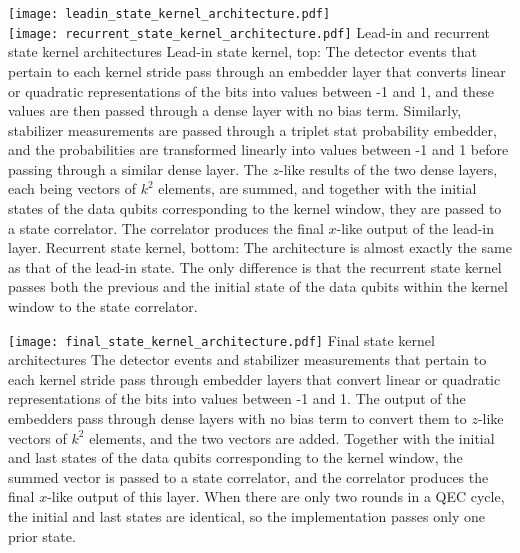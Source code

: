 \begin{figure*}[htb]
\centering
\texttt{[image: leadin\_state\_kernel\_architecture.pdf]}\\
\texttt{[image: recurrent\_state\_kernel\_architecture.pdf]}
\ccaption
{Lead-in and recurrent state kernel architectures}
{
Lead-in state kernel, top: The detector events that pertain to each kernel stride pass through an embedder layer that converts linear or quadratic representations of the bits into values between -1 and 1, and these values are then passed through a dense layer with no bias term. Similarly, stabilizer measurements are passed through a triplet stat probability embedder, and the probabilities are transformed linearly into values between -1 and 1 before passing through a similar dense layer.
The $z$-like results of the two dense layers, each being vectors of $k^2$ elements, are summed, and together with the initial states of the data qubits corresponding to the kernel window, they are passed to a state correlator. The correlator produces the final $x$-like output of the lead-in layer.
Recurrent state kernel, bottom: The architecture is almost exactly the same as that of the lead-in state. The only difference is that the recurrent state kernel passes both the previous and the initial state of the data qubits within the kernel window to the state correlator.
}
\label{fig:RCNN-lirec-arch}
\end{figure*}


\begin{figure*}[htb]
\centering
\texttt{[image: final\_state\_kernel\_architecture.pdf]}
\ccaption
{Final state kernel architectures}
{
The detector events and stabilizer measurements that pertain to each kernel stride pass through embedder layers that convert linear or quadratic representations of the bits into values between -1 and 1.
The output of the embedders pass through dense layers with no bias term to convert them to $z$-like vectors of $k^2$ elements, and the two vectors are added.
Together with the initial and last states of the data qubits corresponding to the kernel window, the summed vector is passed to a state correlator, and the correlator produces the final $x$-like output of this layer.
When there are only two rounds in a QEC cycle, the initial and last states are identical, so the implementation passes only one prior state.
}
\label{fig:RCNN-final-arch}
\end{figure*}


